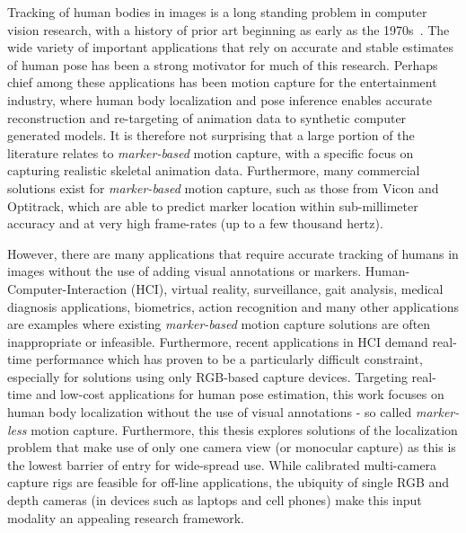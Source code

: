 Tracking of human bodies in images is a long standing problem in computer vision research, with a history of prior art beginning as early as the 1970s~\cite{Fischler73, hogg1983model}. The wide variety of important applications that rely on accurate and stable estimates of human pose has been a strong motivator for much of this research. Perhaps chief among these applications has been motion capture for the entertainment industry, where human body localization and pose inference enables accurate reconstruction and re-targeting of animation data to synthetic computer generated models. It is therefore not surprising that a large portion of the literature relates to \emph{marker-based} motion capture, with a specific focus on capturing realistic skeletal animation data. Furthermore, many commercial solutions exist for \emph{marker-based} motion capture, such as those from Vicon and Optitrack, which are able to predict marker location within sub-millimeter accuracy and at very high frame-rates (up to a few thousand hertz).

However, there are many applications that require accurate tracking of humans in images without the use of adding visual annotations or markers. Human-Computer-Interaction (HCI), virtual reality, surveillance, gait analysis, medical diagnosis applications, biometrics, action recognition and many other applications are examples where existing \emph{marker-based} motion capture solutions are often inappropriate or infeasible. Furthermore, recent applications in HCI demand real-time performance which has proven to be a particularly difficult constraint, especially for solutions using only RGB-based capture devices. Targeting real-time and low-cost applications for human pose estimation, this work focuses on human body localization without the use of visual annotations - so called \emph{marker-less} motion capture. Furthermore, this thesis explores solutions of the localization problem that make use of only one camera view (or monocular capture) as this is the lowest barrier of entry for wide-spread use. While calibrated multi-camera capture rigs are feasible for off-line applications, the ubiquity of single RGB and depth cameras (in devices such as laptops and cell phones) make this input modality an appealing research framework.

